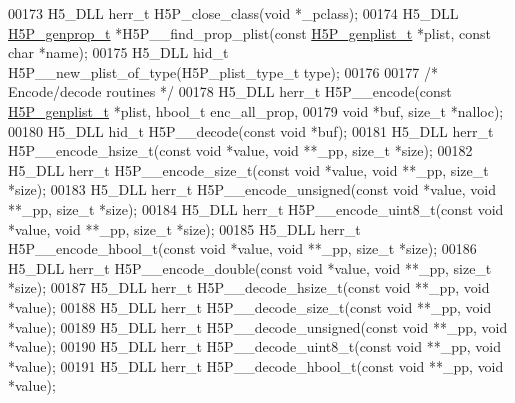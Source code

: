 \begin{DoxyCode}
00173 H5\_DLL herr\_t H5P\_close\_class(\textcolor{keywordtype}{void} *\_pclass);
00174 H5\_DLL \hyperlink{struct_h5_p__genprop__t}{H5P\_genprop\_t} *H5P\_\_find\_prop\_plist(\textcolor{keyword}{const} \hyperlink{struct_h5_p__genplist__t}{H5P\_genplist\_t} *plist, \textcolor{keyword}{const} \textcolor{keywordtype}{
      char} *name);
00175 H5\_DLL hid\_t H5P\_\_new\_plist\_of\_type(H5P\_plist\_type\_t type);
00176 
00177 \textcolor{comment}{/* Encode/decode routines */}
00178 H5\_DLL herr\_t H5P\_\_encode(\textcolor{keyword}{const} \hyperlink{struct_h5_p__genplist__t}{H5P\_genplist\_t} *plist, hbool\_t enc\_all\_prop,
00179     \textcolor{keywordtype}{void} *buf, \textcolor{keywordtype}{size\_t} *nalloc);
00180 H5\_DLL hid\_t H5P\_\_decode(\textcolor{keyword}{const} \textcolor{keywordtype}{void} *buf);
00181 H5\_DLL herr\_t H5P\_\_encode\_hsize\_t(\textcolor{keyword}{const} \textcolor{keywordtype}{void} *value, \textcolor{keywordtype}{void} **\_pp, \textcolor{keywordtype}{size\_t} *size);
00182 H5\_DLL herr\_t H5P\_\_encode\_size\_t(\textcolor{keyword}{const} \textcolor{keywordtype}{void} *value, \textcolor{keywordtype}{void} **\_pp, \textcolor{keywordtype}{size\_t} *size);
00183 H5\_DLL herr\_t H5P\_\_encode\_unsigned(\textcolor{keyword}{const} \textcolor{keywordtype}{void} *value, \textcolor{keywordtype}{void} **\_pp, \textcolor{keywordtype}{size\_t} *size);
00184 H5\_DLL herr\_t H5P\_\_encode\_uint8\_t(\textcolor{keyword}{const} \textcolor{keywordtype}{void} *value, \textcolor{keywordtype}{void} **\_pp, \textcolor{keywordtype}{size\_t} *size);
00185 H5\_DLL herr\_t H5P\_\_encode\_hbool\_t(\textcolor{keyword}{const} \textcolor{keywordtype}{void} *value, \textcolor{keywordtype}{void} **\_pp, \textcolor{keywordtype}{size\_t} *size);
00186 H5\_DLL herr\_t H5P\_\_encode\_double(\textcolor{keyword}{const} \textcolor{keywordtype}{void} *value, \textcolor{keywordtype}{void} **\_pp, \textcolor{keywordtype}{size\_t} *size);
00187 H5\_DLL herr\_t H5P\_\_decode\_hsize\_t(\textcolor{keyword}{const} \textcolor{keywordtype}{void} **\_pp, \textcolor{keywordtype}{void} *value);
00188 H5\_DLL herr\_t H5P\_\_decode\_size\_t(\textcolor{keyword}{const} \textcolor{keywordtype}{void} **\_pp, \textcolor{keywordtype}{void} *value);
00189 H5\_DLL herr\_t H5P\_\_decode\_unsigned(\textcolor{keyword}{const} \textcolor{keywordtype}{void} **\_pp, \textcolor{keywordtype}{void} *value);
00190 H5\_DLL herr\_t H5P\_\_decode\_uint8\_t(\textcolor{keyword}{const} \textcolor{keywordtype}{void} **\_pp, \textcolor{keywordtype}{void} *value);
00191 H5\_DLL herr\_t H5P\_\_decode\_hbool\_t(\textcolor{keyword}{const} \textcolor{keywordtype}{void} **\_pp, \textcolor{keywordtype}{void} *value);

\end{DoxyCode}
